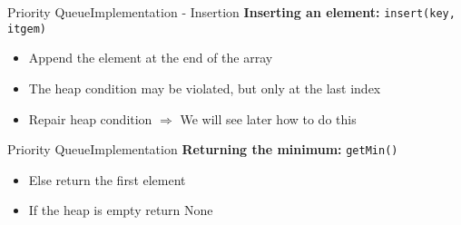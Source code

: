 \begin{frame}{Priority Queue}{Implementation - Insertion}
  \textbf{Inserting an element:}
         {\color{Mittel-Blau}\texttt{insert(key, itgem)}}
           \begin{figure}[!h]
    \begin{adjustbox}{height=0.275\linewidth}
    \end{adjustbox}
    \hspace{-1.5em}
    \begin{adjustbox}{height=0.275\linewidth}
    \end{adjustbox}
    \label{fig:priority_queue:impl_insert}%
  \end{figure}%
  \begin{itemize}
    \item<2->
      Append the element at the end of the array
    \item<3->
      The {\color{Mittel-Blau}heap condition} may be violated, but only at the
      last index
    \item<4->
      Repair {\color{Mittel-Blau}heap condition}
      $\Rightarrow$ We will see later how to do this
  \end{itemize}
\end{frame}


\begin{frame}{Priority Queue}{Implementation}
  \textbf{Returning the minimum:}
         {\color{Mittel-Blau}\texttt{getMin()}}
          \begin{figure}[!h]
    \begin{adjustbox}{height=0.275\linewidth}
    \end{adjustbox}
    \hspace{1.75em}
    \hfill
    \label{fig:priority_queue:impl_peek}%
  \end{figure}%
  \begin{itemize}
    \item<2->
      Else return the first element
    \item<3->
      If the heap is empty return {\color{Mittel-Blau}None}
  \end{itemize}
\end{frame}

